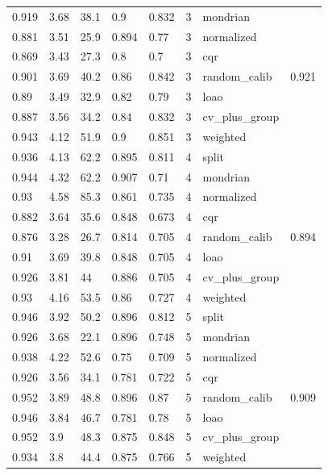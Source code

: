 \begin{tabular}{llllllll}
0.919 & 3.68 & 38.1 & 0.9 & 0.832 & 3 & mondrian &  \\
0.881 & 3.51 & 25.9 & 0.894 & 0.77 & 3 & normalized &  \\
0.869 & 3.43 & 27.3 & 0.8 & 0.7 & 3 & cqr &  \\
0.901 & 3.69 & 40.2 & 0.86 & 0.842 & 3 & random\_calib & 0.921 \\
0.89 & 3.49 & 32.9 & 0.82 & 0.79 & 3 & loao &  \\
0.887 & 3.56 & 34.2 & 0.84 & 0.832 & 3 & cv\_plus\_group &  \\
0.943 & 4.12 & 51.9 & 0.9 & 0.851 & 3 & weighted &  \\
0.936 & 4.13 & 62.2 & 0.895 & 0.811 & 4 & split &  \\
0.944 & 4.32 & 62.2 & 0.907 & 0.71 & 4 & mondrian &  \\
0.93 & 4.58 & 85.3 & 0.861 & 0.735 & 4 & normalized &  \\
0.882 & 3.64 & 35.6 & 0.848 & 0.673 & 4 & cqr &  \\
0.876 & 3.28 & 26.7 & 0.814 & 0.705 & 4 & random\_calib & 0.894 \\
0.91 & 3.69 & 39.8 & 0.848 & 0.705 & 4 & loao &  \\
0.926 & 3.81 & 44 & 0.886 & 0.705 & 4 & cv\_plus\_group &  \\
0.93 & 4.16 & 53.5 & 0.86 & 0.727 & 4 & weighted &  \\
0.946 & 3.92 & 50.2 & 0.896 & 0.812 & 5 & split &  \\
0.926 & 3.68 & 22.1 & 0.896 & 0.748 & 5 & mondrian &  \\
0.938 & 4.22 & 52.6 & 0.75 & 0.709 & 5 & normalized &  \\
0.926 & 3.56 & 34.1 & 0.781 & 0.722 & 5 & cqr &  \\
0.952 & 3.89 & 48.8 & 0.896 & 0.87 & 5 & random\_calib & 0.909 \\
0.946 & 3.84 & 46.7 & 0.781 & 0.78 & 5 & loao &  \\
0.952 & 3.9 & 48.3 & 0.875 & 0.848 & 5 & cv\_plus\_group &  \\
0.934 & 3.8 & 44.4 & 0.875 & 0.766 & 5 & weighted &  \\
\bottomrule
\end{tabular}